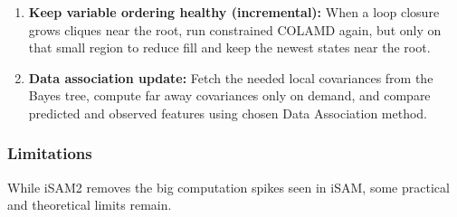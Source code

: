 \begin{enumerate}
    \item \textbf{Keep variable ordering healthy (incremental):} When a loop closure grows cliques near the root, run constrained COLAMD again, but only on that small region to reduce fill and keep the newest states near the root.
    
    \item \textbf{Data association update:} Fetch the needed local covariances from the Bayes tree, compute far away covariances only on demand, and compare predicted and observed features using chosen Data Association method.
\end{enumerate}



\subsubsection{Limitations}
While iSAM2 removes the big computation spikes seen in iSAM, some practical and theoretical limits remain.

